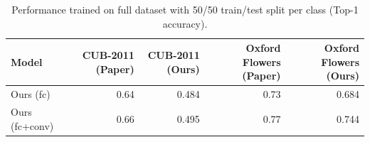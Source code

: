 
\begin{table}[t]
\centering
\scriptsize
\caption{Performance trained on full dataset with 50/50 train/test split per class (Top-1 accuracy).}
\label{tab:table4}
\begin{tabular}{lrrrr}
\toprule
Model & CUB-2011 (Paper) & CUB-2011 (Ours) & Oxford Flowers (Paper) & Oxford Flowers (Ours) \\ \midrule
Ours (fc) & 0.64 & 0.484 & 0.73 & 0.684 \\
Ours (fc+conv) & 0.66 & 0.495 & 0.77 & 0.744 \\
 \bottomrule
\end{tabular}
\end{table}

